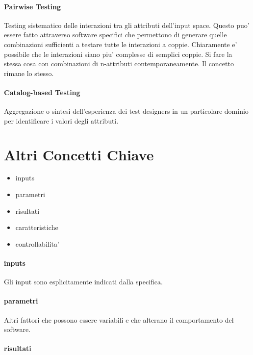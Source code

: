 \paragraph{Pairwise Testing}

Testing sistematico delle interazioni tra gli attributi dell'input space.
Questo puo' essere fatto attraverso software specifici che permettono di generare quelle combinazioni sufficienti a testare tutte le interazioni a coppie.
Chiaramente e' possibile che le interazioni siano piu' complesse di semplici coppie. Si fare la stessa cosa con combinazioni di n-attributi contemporaneamente. Il concetto rimane lo stesso.

\paragraph{Catalog-based Testing}

Aggregazione o sintesi dell'esperienza dei test designers in un particolare dominio  per identificare i valori degli attributi.

\section{Altri Concetti Chiave}

\begin{itemize}
    \item inputs
    \item parametri
    \item risultati
    \item caratteristiche
    \item controllabilita'
\end{itemize}

\paragraph{inputs}

Gli input sono esplicitamente indicati dalla specifica.

\paragraph{parametri}

Altri fattori che possono essere variabili e che alterano il comportamento del software.

\paragraph{risultati}

